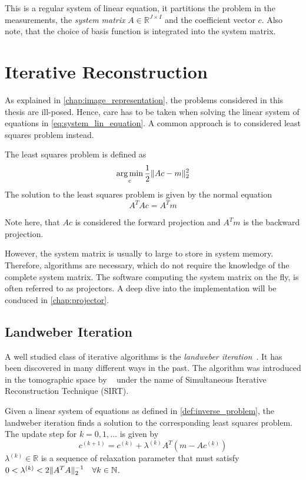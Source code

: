 This is a regular system of linear equation, it partitions the problem in the measurements, the
\textit{system matrix} \(A \in \mathbb{R}^{J \times I}\) and the coefficient vector \(c\). Also
note, that the choice of basis function is integrated into the system matrix.

\section{Iterative Reconstruction}\label{sec:iterative_reconstruction}

As explained in \autoref{chap:image_representation}, the problems considered in this thesis are
ill-posed. Hence, care has to be taken when solving the linear system of equations in
\autoref{eq:system_lin_equation}. A common approach is to considered least squares problem instead.

\begin{definition}\label{def:least_squares_problem}
	The least squares problem is defined as
	\[ \operatorname*{arg\,min}_c \frac{1}{2} \lVert Ac - m\rVert^2_2 \]
	The solution to the least squares problem is given by the normal equation
	\[ A^T A c = A^T m \]
\end{definition}

Note here, that \(Ac\) is considered the forward projection and \(A^T m\) is the backward
projection.

However, the system matrix is usually to large to store in system memory. Therefore, algorithms are
necessary, which do not require the knowledge of the complete system matrix. The software computing
the system matrix on the fly, is often referred to as projectors. A deep dive into the
implementation will be conduced in \autoref{chap:projector}.

\subsection{Landweber Iteration}\label{subsec:landweber_iteration}

A well studied class of iterative algorithms is the \textit{landweber
	iteration}~\cite{landweber_iteration_1951}. It has been discovered in many different ways in
the past. The algorithm was introduced in the tomographic space by
\citeauthor{gilbert_iterative_1972}~\cite{gilbert_iterative_1972} under the name of
Simultaneous Iterative Reconstruction Technique (SIRT).

\begin{definition}\label{def:landweber_iteration}
	Given a linear system of equations as defined in \autoref{def:inverse_problem}, the
	landweber iteration finds a solution to the corresponding least squares problem. The update
	step for \(k = 0, 1, \dots\) is given by
	\[
		c^{(k+1)} = c^{(k)} + \lambda^{(k)} A^T(m - Ac^{(k)})
	\]
	\(\lambda^{(k)} \in \mathbb{R}\) is a sequence of relaxation parameter that must satisfy
	\(0 < \lambda^{(k)} < 2 \lVert A^T A\rVert_2^{-1}\quad \forall k \in \mathbb{N}\).
\end{definition}

